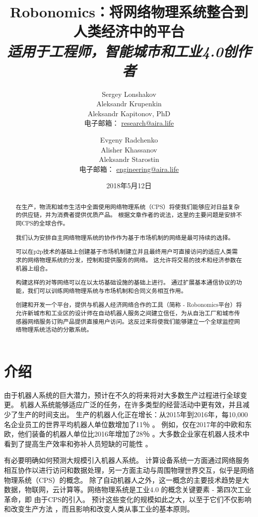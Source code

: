 \documentclass[UTF8]{article}
\title{Robonomics：将网络物理系统整合到人类经济中的平台 \\ \small
\textit{适用于工程师，智能城市和工业4.0创作者}}
\date{2018年5月12日}
\author{Sergey Lonshakov \\ Aleksandr Krupenkin \\ Aleksandr Kapitonov, PhD \\ 电子邮箱： \href{mailto:research@aira.life}{research@aira.life} \and Evgeny Radchenko \\ Alisher Khassanov \\ Aleksandr Starostin \\ 电子邮箱： \href{mailto:engineering@aira.life}{engineering@aira.life} }
\begin{document}
\maketitle
 
\begin{abstract}
在生产，物流和城市生活中全面使用网络物理系统（CPS）将使我们能够应对日益复杂的供应链，并为消费者提供优质产品。 根据文章作者的说法，这里的主要问题是安排不同CPS的全球合作。

我们认为安排自主网络物理系统的协作作为基于市场机制的网络是最可持续的选择。

可以在p2p技术的基础上创建基于市场机制建立并且最终用户可直接访问的适应人类需求的网络物理系统的分发，控制和提供服务的网络。 这允许将交易的技术和经济参数在机器上组合。

构建这样的对等网络可以在以太坊基础设施的基础上进行。 通过扩展基本通信协议的功能，我们可以训练网络物理系统与市场机制和合同义务相互作用。

创建和开发一个平台，提供与机器人经济网络合作的工具（简称 -  Robonomics平台）将允许新城市和工业区的设计师在自动机器人服务之间建立信任，为从自治工厂和城市传感器网络服务订购产品提供直接用户访问。这反过来将使我们能够建立一个全球监控网络物理系统活动的分散系统。
\end{abstract}

\tableofcontents

\section{介绍}
由于机器人系统的巨大潜力，预计在不久的将来\cite{Pedersen2016RobotDeployment}将对大多数生产过程进行全球变更。 机器人系统能够适应\cite{Stock2016Opportunities4.0}广泛的任务，在许多类型的经营活动中更有效，并且减少了生产的时间支出。 生产的机器人化正在增长：从2015年到2016年，每10,000名企业员工的世界平均机器人单位数增加了11％ \cite{2018RobotRobotics.}。 例如，仅在2017年的中欧和东欧，他们装备的机器人单位比2016年增加了28％ \cite{2018EnterFactories} 。大多数企业家在机器人技术中看到了提高生产效率和弥补人员短缺的可能性 \cite{2018EnterFactories} 。

有必要明确如何预测大规模引入机器人系统。 计算设备系统一方面通过网络服务相互协作以进行访问和数据处理，另一方面主动与周围物理世界交互，似乎是网络物理系统（CPS）的概念\cite{Kang2016SmartDirections}。 除了自动机器人之外，这一概念的主要技术趋势是大数据，物联网，云计算等。网络物理系统是工业4.0 \cite{Jazdi2014Cyber4.0}的概念关键要素 - 第四次工业革命，即 由于CPS的引入。 预计这些变化的规模如此之大，以至于它们不仅影响和改变生产方法\cite{MonostoriLaszlo2014Cyber-physicalChallenges} ，而且影响和改变人类从事工业的基本原则。
\end{document}
